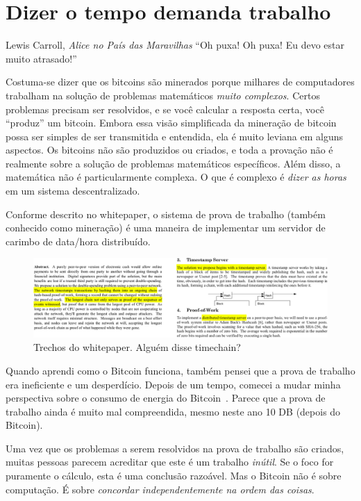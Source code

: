 \chapter{Dizer o tempo demanda trabalho}
\label{les:17}

\begin{chapquote}{Lewis Carroll, \textit{Alice no País das Maravilhas}}
\enquote{Oh puxa! Oh puxa! Eu devo estar muito atrasado!}
\end{chapquote}

Costuma-se dizer que os bitcoins são minerados porque milhares de computadores trabalham na solução de problemas matemáticos \textit{muito complexos}. Certos problemas precisam ser resolvidos, e se você calcular a resposta certa, você \enquote{produz} um bitcoin. Embora essa visão simplificada da mineração de bitcoin possa ser simples de ser transmitida e entendida, ela é muito leviana em alguns aspectos. Os bitcoins não são produzidos ou criados, e toda a provação não é realmente sobre a solução de problemas matemáticos específicos. Além disso, a matemática não é particularmente complexa. O que é complexo é \textit{dizer as horas} em um sistema descentralizado.

Conforme descrito no whitepaper, o sistema de prova de trabalho (também conhecido como mineração) é uma maneira de implementar um servidor de carimbo de data/hora distribuído.

\begin{figure}
  \includegraphics{assets/images/bitcoin-whitepaper-timestamp-wide.png}
  \caption{Trechos do whitepaper. Alguém disse timechain?}
  \label{fig:bitcoin-whitepaper-timestamp-wide}
\end{figure}

Quando aprendi como o Bitcoin funciona, também pensei que a prova de trabalho era ineficiente e um desperdício. Depois de um tempo, comecei a mudar minha perspectiva sobre o consumo de energia do Bitcoin~\cite{gigi:energy}. Parece que a prova de trabalho ainda é muito mal compreendida, mesmo neste ano 10 DB (depois do Bitcoin).

Uma vez que os problemas a serem resolvidos na prova de trabalho são criados, muitas pessoas parecem acreditar que este é um trabalho \textit{inútil}. Se o foco for puramente o cálculo, esta é uma conclusão razoável. Mas o Bitcoin não é sobre computação. É sobre \textit{concordar independentemente na ordem das coisas}.


